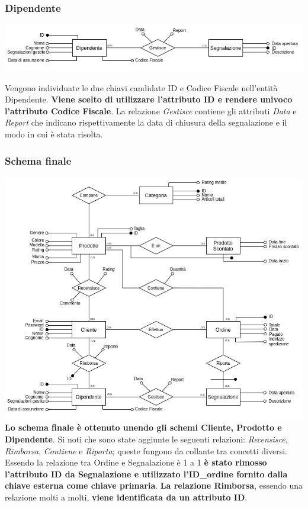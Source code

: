 \subsubsection{Dipendente}
\begin{center}
\includegraphics[scale=0.60]{images/segnalazione.png}
\end{center}
Vengono individuate le due chiavi candidate ID e Codice Fiscale nell'entità Dipendente. \textbf{Viene scelto di utilizzare l'attributo ID e rendere univoco l'attributo Codice Fiscale}. La relazione \textit{Gestisce} contiene gli attributi \textit{Data} e \textit{Report} che indicano rispettivamente la data di chiusura della segnalazione e il modo in cui è stata risolta.
\subsubsection{Schema finale}
\includegraphics[scale=0.55]{images/schema_finale.png}
\textbf{Lo schema finale è ottenuto unendo gli schemi Cliente, Prodotto e Dipendente}. Si noti che sono state aggiunte le seguenti relazioni: \textit{Recensisce}, \textit{Rimborsa}, \textit{Contiene} e \textit{Riporta}; queste fungono da collante tra concetti diversi. Essendo la relazione tra Ordine e Segnalazione è 1 a 1 \textbf{è stato rimosso l'attributo ID da Segnalazione e utilizzato l'ID\_ordine fornito dalla chiave esterna come chiave primaria}. \textbf{La relazione Rimborsa}, essendo una relazione molti a molti,\textbf{ viene identificata da un attributo ID}.